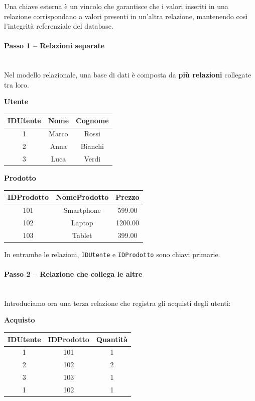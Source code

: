 \documentclass[a4paper,12pt]{article}
\begin{document}
Una chiave esterna è un vincolo che garantisce che i valori inseriti in una relazione corrispondano a valori presenti in un’altra relazione, mantenendo così l’integrità referenziale del database.

\paragraph{Passo 1 -- Relazioni separate}\mbox{}\\
Nel modello relazionale, una base di dati è composta da \textbf{più relazioni} collegate tra loro.  

\vspace{0.5cm}
\textbf{Utente}
\begin{center}
\begin{tabular}{|c|c|c|}
\hline
\textbf{IDUtente} & \textbf{Nome} & \textbf{Cognome} \\
\hline
1 & Marco & Rossi \\
2 & Anna & Bianchi \\
3 & Luca & Verdi \\
\hline
\end{tabular}
\end{center}

\textbf{Prodotto}
\begin{center}
\begin{tabular}{|c|c|c|}
\hline
\textbf{IDProdotto} & \textbf{NomeProdotto} & \textbf{Prezzo} \\
\hline
101 & Smartphone & 599.00 \\
102 & Laptop & 1200.00 \\
103 & Tablet & 399.00 \\
\hline
\end{tabular}
\end{center}

In entrambe le relazioni, \texttt{IDUtente} e \texttt{IDProdotto} sono chiavi primarie.

\paragraph{Passo 2 -- Relazione che collega le altre}\mbox{}\\
Introduciamo ora una terza relazione che registra gli acquisti degli utenti:

\vspace{0.5cm}
\textbf{Acquisto}
\begin{center}
\begin{tabular}{|c|c|c|}
\hline
\textbf{IDUtente} & \textbf{IDProdotto} & \textbf{Quantità} \\
\hline
1 & 101 & 1 \\
2 & 102 & 2 \\
3 & 103 & 1 \\
1 & 102 & 1 \\
\hline
\end{tabular}
\end{center}
\end{document}
